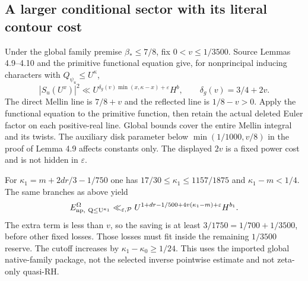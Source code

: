 \documentclass[11pt]{article}
\theoremstyle{definition}
\newcommand{\eps}{\varepsilon}
\newcommand{\lls}{\ll_{\eps,\mathcal P}}
\begin{document}
\subsection{A larger conditional sector with its literal contour cost}
Under the global family premise $\beta_*\le7/8$, fix
$0<v\le1/3500$. Source Lemmas 4.9--4.10 and the primitive functional
equation give, for nonprincipal inducing characters with
$Q_{\psi_u}\le U^\kappa$,
\begin{equation}\label{ctr-global-envelope}
 |S_u(U^x)|^2\ll
 U^{\delta_g(v)\min(x,\kappa-x)+\eps}H^b,\qquad
 \delta_g(v)=3/4+2v .
\end{equation}
The direct Mellin line is $7/8+v$ and the reflected line is
$1/8-v>0$. Apply the functional equation to the primitive function,
then retain the actual deleted Euler factor on each positive-real
line. Global bounds cover the entire Mellin integral and its twists.
The auxiliary disk parameter below $\min(1/1000,v/8)$ in the proof
of Lemma 4.9 affects constants only. The displayed $2v$ is a fixed
power cost and is not hidden in $\eps$.

For $\kappa_1=m+2dr/3-1/750$ one has
$17/30\le\kappa_1\le1157/1875$ and $\kappa_1-m<1/4$.
The same branches as above yield
\begin{equation}\label{ctr-global-sector}
 E_{\rm np,\ Q\le U^{\kappa_1}}^\Omega
 \lls U^{1+dr-1/500+4v(\kappa_1-m)+\eps}H^{b_1}.
\end{equation}
The extra term is less than $v$, so the saving is at least
$3/1750=1/700+1/3500$, before other fixed losses.
Those losses must fit inside the remaining $1/3500$ reserve.
The cutoff increases by $\kappa_1-\kappa_0\ge1/24$.
This uses the imported global native-family package, not the selected
inverse pointwise estimate and not zeta-only quasi-RH.
\end{document}
